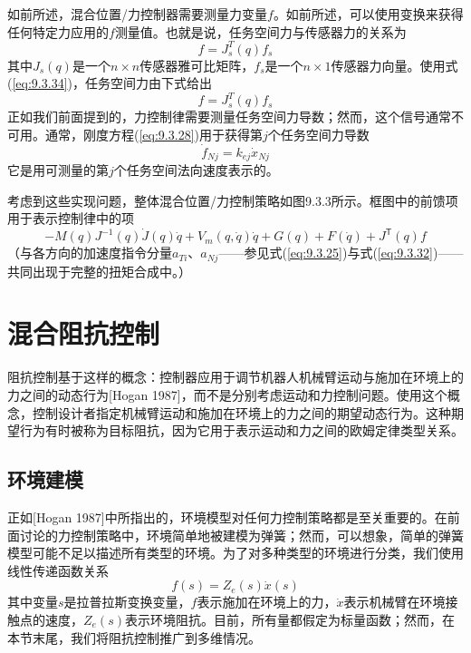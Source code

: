 \documentclass[12pt,a4paper]{ctexart}
\begin{document}
如前所述，混合位置/力控制器需要测量力变量$f$。如前所述，可以使用变换来获得任何特定力应用的$f$测量值。也就是说，任务空间力与传感器力的关系为
\begin{equation}\label{eq:9.3.34}
f = J_s^T(q) f_s
\end{equation}
其中$J_s(q)$是一个$n \times n$传感器雅可比矩阵，$f_s$是一个$n \times 1$传感器力向量。使用式(\ref{eq:9.3.34})，任务空间力由下式给出
\begin{equation}\label{eq:9.3.35}
f = J_s^T(q) f_s
\end{equation}
正如我们前面提到的，力控制律需要测量任务空间力导数；然而，这个信号通常不可用。通常，刚度方程(\ref{eq:9.3.28})用于获得第$j$个任务空间力导数
\begin{equation}\label{eq:9.3.36}
\dot{f}_{Nj} = k_{ej}\dot{x}_{Nj}
\end{equation}
它是用可测量的第$j$个任务空间法向速度表示的。

考虑到这些实现问题，整体混合位置/力控制策略如图9.3.3所示。框图中的前馈项用于表示控制律中的项
\begin{equation}\label{eq:9.3.37}
-M(q)J^{-1}(q)\dot{J}(q)\dot{q} + V_m(q,\dot{q})\dot{q} + G(q) + F(\dot{q}) + J^{\mathsf T}(q)f
\end{equation}
（与各方向的加速度指令分量$a_{Ti}$、$a_{Nj}$——参见式(\ref{eq:9.3.25})与式(\ref{eq:9.3.32})——共同出现于完整的扭矩合成中。）

\section{混合阻抗控制}\label{sec:9.4}

阻抗控制基于这样的概念：控制器应用于调节机器人机械臂运动与施加在环境上的力之间的动态行为[Hogan 1987]，而不是分别考虑运动和力控制问题。使用这个概念，控制设计者指定机械臂运动和施加在环境上的力之间的期望动态行为。这种期望行为有时被称为目标阻抗，因为它用于表示运动和力之间的欧姆定律类型关系。

\subsection{环境建模}

正如[Hogan 1987]中所指出的，环境模型对任何力控制策略都是至关重要的。在前面讨论的力控制策略中，环境简单地被建模为弹簧；然而，可以想象，简单的弹簧模型可能不足以描述所有类型的环境。为了对多种类型的环境进行分类，我们使用线性传递函数关系
\begin{equation}\label{eq:9.4.1}
f(s) = Z_e(s)\dot{x}(s)
\end{equation}
其中变量$s$是拉普拉斯变换变量，$f$表示施加在环境上的力，$\dot{x}$表示机械臂在环境接触点的速度，$Z_e(s)$表示环境阻抗。目前，所有量都假定为标量函数；然而，在本节末尾，我们将阻抗控制推广到多维情况。
\end{document}
